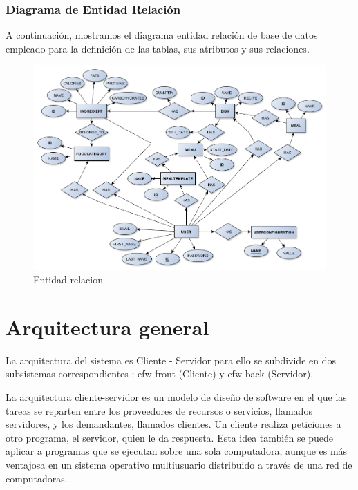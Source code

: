 \documentclass[12pt, a4paper, twoside]{book}
\begin{document}
	\subsubsection{Diagrama de Entidad Relación}
	A continuación, mostramos el diagrama entidad relación de base de datos empleado para la definición de las tablas, sus atributos y sus relaciones.
	\begin{figure}[H]
		\centering
		\includegraphics[width=15cm]{Imagenes/EntidadRelacion.png}
		\caption{Entidad relacion}\label{Entidad relacion}
	\end{figure}
	
	\section{Arquitectura general}
	
	La arquitectura del sistema es Cliente - Servidor para ello se subdivide en dos subsistemas correspondientes : efw-front (Cliente) y efw-back (Servidor).
	
	La arquitectura cliente-servidor es un modelo de diseño de software en el que las tareas se reparten entre los proveedores de recursos o servicios, llamados servidores, y los demandantes, llamados clientes. Un cliente realiza peticiones a otro programa, el servidor, quien le da respuesta. Esta idea también se puede aplicar a programas que se ejecutan sobre una sola computadora, aunque es más ventajosa en un sistema operativo multiusuario distribuido a través de una red de computadoras. \cite{Software Architecture}
	
\end{document}
